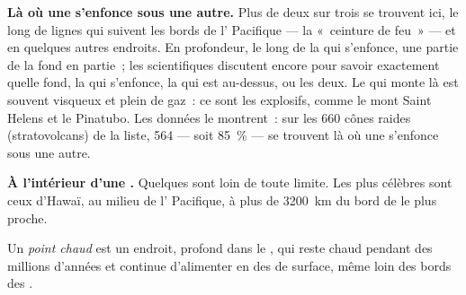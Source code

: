 \textbf{Là où une  s'enfonce sous une autre.} Plus de deux 
sur trois se trouvent ici, le long de lignes qui suivent les bords de
l' Pacifique --- la «~ceinture de feu~» --- et en quelques autres
endroits. En profondeur, le long de la  qui s'enfonce, une partie de
la  fond en partie~; les scientifiques discutent encore pour savoir
exactement quelle  fond, la  qui s'enfonce, la  qui est
au-dessus, ou les deux. Le  qui monte là est souvent visqueux et
plein de gaz~: ce sont les  explosifs, comme le mont Saint Helens
et le Pinatubo. Les données le montrent~: sur les 660 cônes raides
(stratovolcans) de la liste, 564 --- soit 85~\% --- se trouvent là où une
 s'enfonce sous une autre.

\textbf{À l'intérieur d'une .} Quelques  sont loin de toute
limite. Les plus célèbres sont ceux d'Hawaï, au milieu de l'
Pacifique, à plus de \qty{3200}{km} du bord de  le plus proche.

\begin{definition}\label{def:g7:volcanoes:hotspot}
Un \emph{point chaud} est un endroit, profond dans le
, qui reste chaud pendant des millions d'années et continue
d'alimenter en  des  de surface, même loin des bords des
.
\end{definition}


